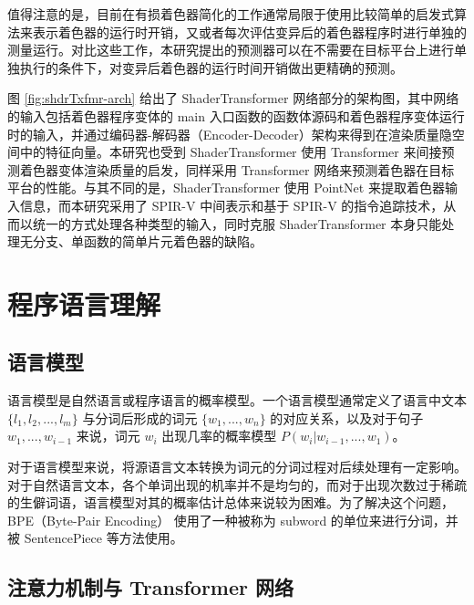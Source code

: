 值得注意的是，目前在有损着色器简化的工作通常局限于使用比较简单的启发式算法来表示着色器的运行时开销\cite{10.1145/2816795.2818104, 10.1111/cgf.13482, 10.1145/3528233.3530722}，又或者每次评估变异后的着色器程序时进行单独的测量运行\cite{10.1145/2661229.2661276}。对比这些工作，本研究提出的预测器可以在不需要在目标平台上进行单独执行的条件下，对变异后着色器的运行时间开销做出更精确的预测。

图 \ref{fig:shdrTxfmr-arch} 给出了 ShaderTransformer 网络部分的架构图，其中网络的输入包括着色器程序变体的 main 入口函数的函数体源码和着色器程序变体运行时的输入，并通过编码器-解码器（Encoder-Decoder）架构来得到在渲染质量隐空间中的特征向量。本研究也受到 ShaderTransformer 使用 Transformer 来间接预测着色器变体渲染质量的启发，同样采用 Transformer 网络来预测着色器在目标平台的性能。与其不同的是，ShaderTransformer 使用 PointNet\cite{8099499} 来提取着色器输入信息，而本研究采用了 SPIR-V 中间表示和基于 SPIR-V 的指令追踪技术，从而以统一的方式处理各种类型的输入，同时克服 ShaderTransformer 本身只能处理无分支、单函数的简单片元着色器的缺陷。

\section{程序语言理解}

\label{sec:pl_understanding}

\subsection{语言模型}

\label{sec:language_model}

语言模型是自然语言或程序语言的概率模型。一个语言模型通常定义了语言中文本 $\{l_1, l_2, ..., l_m\}$ 与分词后形成的词元 $\{w_1, ..., w_n\}$ 的对应关系，以及对于句子 $ w_1, ..., w_{i-1} $ 来说，词元 $ w_i$ 出现几率的概率模型 $P(w_i|w_{i-1}, ..., w_{1})
$。


对于语言模型来说，将源语言文本转换为词元的分词过程对后续处理有一定影响。对于自然语言文本，各个单词出现的机率并不是均匀的，而对于出现次数过于稀疏的生僻词语，语言模型对其的概率估计总体来说较为困难。为了解决这个问题，BPE（Byte-Pair Encoding）\cite{sennrich-etal-2016-neural} 使用了一种被称为 subword 的单位来进行分词，并被 SentencePiece \cite{kudo-richardson-2018-sentencepiece} 等方法使用。

\subsection{注意力机制与 Transformer 网络}

